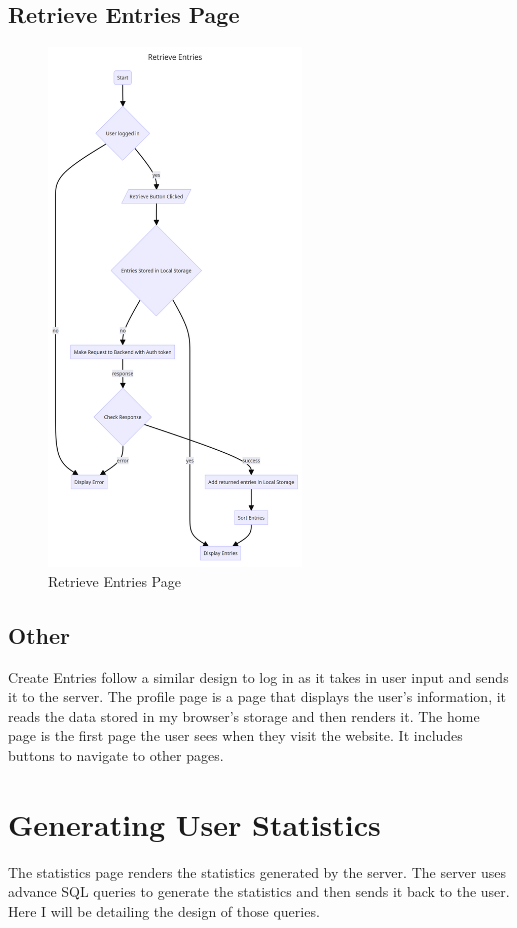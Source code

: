 \subsection{Retrieve Entries Page}
\begin{figure}[H]
    \centering
    \includegraphics[width=0.6\textwidth]{Assets/retrievePageFlow.png}
    \caption{Retrieve Entries Page}
\end{figure}


\subsection{Other}
Create Entries follow a similar design to log in as it takes in user input and sends it to the server. The profile page is a page that displays the user's information, it reads the data stored in my browser's storage and then renders it. The home page is the first page the user sees when they visit the website. It includes buttons to navigate to other pages. 

\section{Generating User Statistics}
The statistics page renders the statistics generated by the server. The server uses advance SQL queries to generate the statistics and then sends it back to the user. Here I will be detailing the design of those queries.

